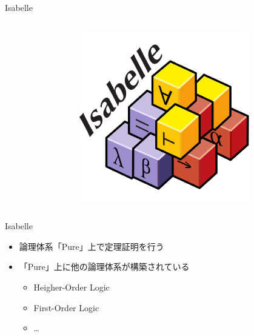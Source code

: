 \documentclass[17pt,aspectratio=169]{beamer}
\begin{document}
\begin{frame}{Isabelle}
\begin{columns}
\begin{column}{0.75\textwidth}
        \end{column}
        \begin{column}{0.25\textwidth}
            \begin{figure}
                \includegraphics[width=1.0\linewidth]{./images/isabelle_logo.png}
            \end{figure}
        \end{column}
    \end{columns}

\end{frame}



\begin{frame}{Isabelle}
    \begin{itemize}
        \item 論理体系「Pure」上で定理証明を行う
        \item 「Pure」上に他の論理体系が構築されている
              {\small \begin{itemize}
                  \item Heigher-Order Logic
                  \item First-Order Logic \\
                  \item \dots
              \end{itemize} }
    \end{itemize}
    \vspace{-10pt}
\end{frame}
\end{document}
